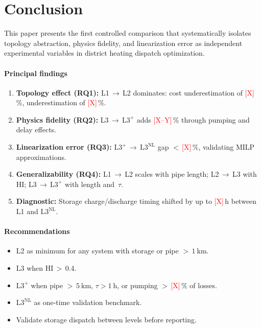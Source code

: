 \documentclass[review,3p]{elsarticle}
\newcommand{\placeholder}[1]{\textcolor{red}{[#1]}}
\newcommand{\Lplus}{\mathrm{L3}^{+}}
\newcommand{\Lnl}{\mathrm{L3}^{\mathrm{NL}}}
\begin{document}
\section{Conclusion}
\label{sec:conclusion}

This paper presents the first controlled comparison that
systematically isolates topology abstraction, physics fidelity, and
linearization error as independent experimental variables in district
heating dispatch optimization.

\paragraph{Principal findings}
\begin{enumerate}[nosep]
  \item \textbf{Topology effect (RQ1):} L1\,$\to$\,L2 dominates:
        cost underestimation of \placeholder{X}\,\%, 
        underestimation of \placeholder{X}\,\%.
  \item \textbf{Physics fidelity (RQ2):} L3\,$\to$\,$\Lplus$ adds
        \placeholder{X--Y}\,\% through pumping and delay effects.
  \item \textbf{Linearization error (RQ3):}
        $\Lplus$\,$\to$\,$\Lnl$ gap
        ${<}\,$\placeholder{X}\,\%, validating MILP approximations.
  \item \textbf{Generalizability (RQ4):} L1\,$\to$\,L2 scales with
        pipe length; L2\,$\to$\,L3 with HI; L3\,$\to$\,$\Lplus$ with
        length and~$\tau$.
  \item \textbf{Diagnostic:} Storage charge/discharge timing shifted
        by up to \placeholder{X}\,h between L1 and $\Lnl$.
\end{enumerate}

\paragraph{Recommendations}
\begin{itemize}[nosep]
  \item L2 as minimum for any system with storage or pipe
        ${>}\,\SI{1}{\kilo\metre}$.
  \item L3 when HI\,$>$\,0.4.
  \item $\Lplus$ when pipe ${>}\,\SI{5}{\kilo\metre}$,
        $\tau > \SI{1}{\hour}$, or pumping
        ${>}\,$\placeholder{X}\,\% of losses.
  \item $\Lnl$ as one-time validation benchmark.
  \item Validate storage dispatch between levels before reporting.
\end{itemize}
\end{document}
